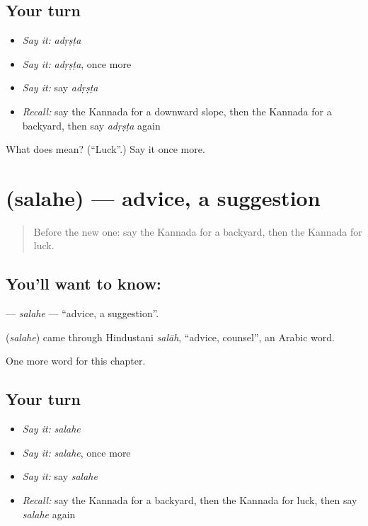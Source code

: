 \subsection*{Your turn}
\begin{itemize}
\raggedright
  \item \emph{Say it:} \emph{adṛṣṭa}
  \item \emph{Say it:} \emph{adṛṣṭa}, once more
  \item \emph{Say it:} say \emph{adṛṣṭa}
  \item \emph{Recall:} say the Kannada for a downward slope, then the Kannada for a backyard, then say \emph{adṛṣṭa} again
\end{itemize}

\begin{tcolorbox}[breakable,colback=teal!4,colframe=teal!35!black,title={Before you move on}]
What does  mean? (\textquotedblleft{}Luck\textquotedblright{}.) Say it once more.
\end{tcolorbox}
\section[\texorpdfstring{\kn{ಸಲಹೆ} (salahe)}{ಸಲಹೆ (salahe)}]{ (salahe) — advice, a suggestion}

\label{lesson:KA-C252-salahe}



\begin{quote}
Before the new one: say the Kannada for a backyard, then the Kannada for luck.
\end{quote}

\subsection*{You'll want to know: }
\textbf{} — \emph{salahe} — \textquotedblleft{}advice, a suggestion\textquotedblright{}.

\begin{cousinweb}
\textbf{} (\emph{salahe}) came through Hindustani \emph{salāh}, \textquotedblleft{}advice, counsel\textquotedblright{}, an Arabic word.
\end{cousinweb}

\begin{grammarlens}[title={What you've built}]
One more word for this chapter.
\end{grammarlens}

\subsection*{Your turn}
\begin{itemize}
\raggedright
  \item \emph{Say it:} \emph{salahe}
  \item \emph{Say it:} \emph{salahe}, once more
  \item \emph{Say it:} say \emph{salahe}
  \item \emph{Recall:} say the Kannada for a backyard, then the Kannada for luck, then say \emph{salahe} again
\end{itemize}

